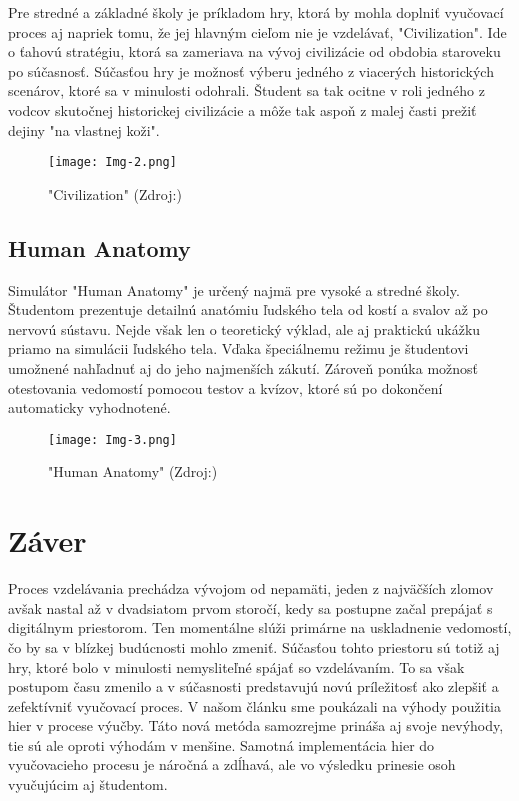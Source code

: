 \documentclass[10pt,twoside,slovak,a4paper]{article}
\begin{document}
Pre stredné a základné školy je príkladom hry, ktorá by mohla doplniť vyučovací proces aj napriek tomu, že jej hlavným cieľom nie je vzdelávať, "Civilization"\cite{Civil}. Ide o ťahovú stratégiu, ktorá sa zameriava na vývoj civilizácie od obdobia staroveku po súčasnosť. Súčasťou hry je možnosť výberu jedného z viacerých historických scenárov, ktoré sa v minulosti odohrali. Študent sa tak ocitne v roli jedného z vodcov skutočnej historickej civilizácie a môže tak aspoň z malej časti prežiť dejiny "na vlastnej koži".

\begin{figure}[tbh]
	\centering
	\texttt{[image: Img-2.png]}
	\caption{"Civilization" (Zdroj:\cite{Img-Civil})}
	\label{obr-2}
\end{figure}

\subsection{Human Anatomy} \label{hra-3}

Simulátor "Human Anatomy"\cite{Antom} je určený najmä pre vysoké a stredné školy. Študentom prezentuje detailnú anatómiu ľudského tela od kostí a svalov až po nervovú sústavu. Nejde však len o teoretický výklad, ale aj praktickú ukážku priamo na simulácii ľudského tela. Vďaka špeciálnemu režimu je študentovi umožnené nahľadnuť aj do jeho najmenších zákutí. Zároveň ponúka možnosť otestovania vedomostí pomocou testov a kvízov, ktoré sú po dokončení automaticky vyhodnotené.

\begin{figure}[tbh]
	\centering
	\texttt{[image: Img-3.png]}
	\caption{"Human Anatomy" (Zdroj:\cite{Img-Antom})}
	\label{obr-3}
\end{figure}

\section{Záver}

Proces vzdelávania prechádza vývojom od nepamäti, jeden z najväčších zlomov avšak nastal až v dvadsiatom prvom storočí, kedy sa postupne začal prepájať s digitálnym priestorom. Ten momentálne slúži primárne na uskladnenie vedomostí, čo by sa v blízkej budúcnosti mohlo zmeniť. Súčasťou tohto priestoru sú totiž aj hry, ktoré bolo v minulosti nemysliteľné spájať so vzdelávaním. To sa však postupom času zmenilo a v súčasnosti predstavujú novú príležitosť ako zlepšiť a zefektívniť vyučovací proces. V našom článku sme poukázali na výhody použitia hier v procese výučby. Táto nová metóda samozrejme prináša aj svoje nevýhody, tie sú ale oproti výhodám v menšine. Samotná implementácia hier do vyučovacieho procesu je náročná a zdĺhavá, ale vo výsledku prinesie osoh vyučujúcim aj študentom.



\end{document}
